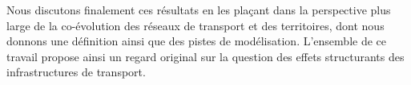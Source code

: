 \documentclass[11pt]{article}
\begin{document}
Nous discutons finalement ces résultats en les plaçant dans la perspective plus large de la co-évolution des réseaux de transport et des territoires, dont nous donnons une définition ainsi que des pistes de modélisation. L'ensemble de ce travail propose ainsi un regard original sur la question des effets structurants des infrastructures de transport.






%
\end{document}
